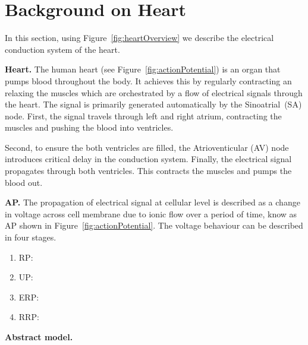 \section{Background on Heart }
\begin{figure*}[htbp]
	\centering
	
	\caption{Electrical conduction systems of a heart}
	\label{fig:heartOverview}
\end{figure*}

In this section, using Figure~\ref{fig:heartOverview} we 
describe the electrical conduction system of the heart.

\noindent \textbf{Heart.}
The human heart (see Figure~\ref{fig:actionPotential})
 is an organ that pumps blood throughout the body.
It achieves this by regularly contracting an relaxing the muscles
which are orchestrated by a flow of electrical signals through the heart.
The signal is primarily generated automatically by the Sinoatrial~(SA) node.
First, the signal travels through left and right atrium, contracting 
the muscles and pushing the blood into ventricles.
 
Second, to ensure the both ventricles are filled, 
the Atrioventicular (AV) node introduces critical delay 
in the conduction system.   
Finally, the electrical signal propagates through 
both ventricles. This contracts the muscles and pumps the blood out.


	
\noindent \textbf{\acf{AP}.} 
The propagation of electrical signal at cellular level 
is described as a change in  voltage 
across cell membrane due to ionic flow over a period of time, 
know as \acf{AP} shown in Figure~\ref{fig:actionPotential}.  
The voltage behaviour can be described in four stages.
\begin{enumerate}
	\item \acf{RP}:
	\item \acf{UP}:
	\item \acf{ERP}:
	\item \acf{RRP}:
	
\end{enumerate} 

\noindent \textbf{Abstract model.}